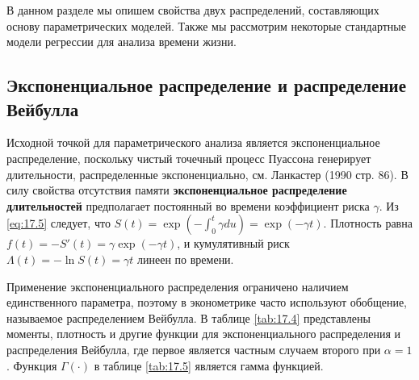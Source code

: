 \noindent
В данном разделе мы опишем свойства двух распределений, составляющих основу параметрических моделей. Также мы рассмотрим некоторые стандартные модели регрессии для анализа времени жизни.


\subsection{Экспоненциальное распределение и распределение Вейбулла}\label{sec:17.6.1}

\noindent
Исходной точкой для параметрического анализа является экспоненциальное распределение, поскольку чистый точечный процесс Пуассона генерирует длительности, распределенные экспоненциально, см. Ланкастер (1990 стр. 86). В силу свойства отсутствия памяти \textbf{экспоненциальное распределение длительностей} предполагает постоянный во времени коэффициент риска $\gamma$. Из \ref{eq:17.5} следует, что $S(t)=\exp{(-\int^t_0\gamma d u)}=\exp{(-\gamma t)}$. Плотность равна $f(t)=-S'(t)=\gamma\exp{(-\gamma t)}$, и кумулятивный риск $\Lambda(t)=-\ln S(t)=\gamma t$ линеен по времени.

Применение экспоненциального распределения ограничено наличием единственного параметра, поэтому в эконометрике часто используют обобщение, называемое распределением Вейбулла. В таблице \ref{tab:17.4} представлены моменты, плотность и другие функции для экспоненциального распределения и распределения Вейбулла, где первое является частным случаем второго при $\alpha=1$. Функция $\Gamma(\cdot)$ в таблице \ref{tab:17.5} является гамма функцией.

